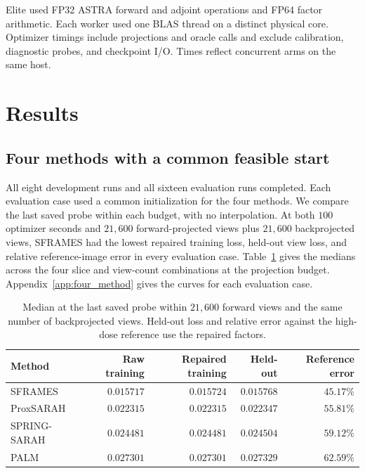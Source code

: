 \documentclass[11pt]{article}
\begin{document}
Elite used FP32 ASTRA forward and adjoint operations and FP64 factor arithmetic. Each worker used one BLAS thread on a distinct physical core. Optimizer timings include projections and oracle calls and exclude calibration, diagnostic probes, and checkpoint I/O. Times reflect concurrent arms on the same host.
\section{Results}
\label{sec:results}

\subsection{Four methods with a common feasible start}

All eight development runs and all sixteen evaluation runs completed. Each
evaluation case used a common initialization for the four methods. We compare
the last saved probe within each budget, with no interpolation. At both
\(100\) optimizer seconds and \(21{,}600\) forward-projected views plus
\(21{,}600\) backprojected views, SFRAMES had the lowest repaired training loss,
held-out view loss, and relative reference-image error in every evaluation
case. Table~\ref{tab:matched-methods} gives the medians across the four
slice and view-count combinations at the projection budget.
Appendix~\ref{app:four_method} gives the curves for each evaluation case.

\begin{table}[htbp]
\centering
\caption{Median at the last saved probe within \(21{,}600\) forward views
and the same number of backprojected views. Held-out loss and relative error
against the high-dose reference use the repaired factors.}
\label{tab:matched-methods}
\begin{tabular}{@{}lrrrr@{}}
\toprule
Method & Raw training & Repaired training & Held-out & Reference error \\
\midrule
SFRAMES     & \(0.015717\) & \(0.015724\) & \(0.015768\) & \(45.17\%\) \\
ProxSARAH   & \(0.022315\) & \(0.022315\) & \(0.022347\) & \(55.81\%\) \\
SPRING-SARAH & \(0.024481\) & \(0.024481\) & \(0.024504\) & \(59.12\%\) \\
PALM        & \(0.027301\) & \(0.027301\) & \(0.027329\) & \(62.59\%\) \\
\bottomrule
\end{tabular}
\end{table}
\end{document}
